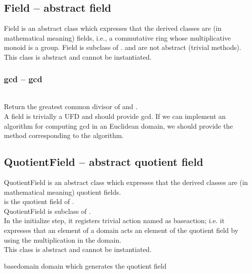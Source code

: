  \subsection{\negok Field -- abstract field}
  \quad Field is an abstract class which expresses that
    the derived classes are (in mathematical meaning) fields,
    i.e., a commutative ring whose multiplicative monoid is a group.
  \spacing
  \quad Field is subclass of .
   and  are not abstract (trivial methods).\\
  \spacing
  This class is abstract and cannot be instantiated.\\
  \method
  \subsubsection{gcd -- gcd}
   \\
   \spacing
   \quad Return the greatest common divisor of  and .\\
   \spacing
   \quad  A field is trivially a UFD and should provide gcd.
   If we can implement an algorithm for computing gcd in an Euclidean domain, 
   we should provide the method corresponding to the algorithm. 
   \\
   \spacing
\C

 \subsection{\negok QuotientField -- abstract quotient field}
  \quad QuotientField is an abstract class which expresses that
    the derived classes are (in mathematical meaning) quotient fields.\\
  \spacing
  \quad {} is the quotient field of .\\
  QuotientField is subclass of .\\
  In the initialize step, it registers trivial action named as baseaction;
  i.e. it expresses that an element of a domain acts an element of the quotient field by using the multiplication in the domain.\\
  \spacing
  This class is abstract and cannot be instantiated.\\
  \begin{at}
    \item[basedomain] domain which generates the quotient field 
  \end{at}
\C

